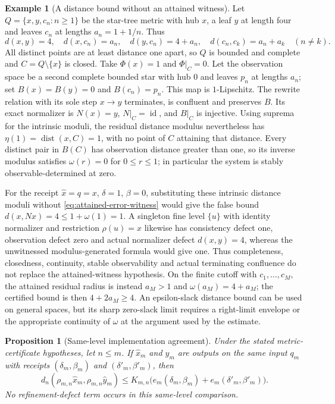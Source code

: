 \documentclass[11pt]{article}
\newtheorem{proposition}[theorem]{Proposition}
\theoremstyle{definition}
\newtheorem{example}[theorem]{Example}
\theoremstyle{remark}
\numberwithin{equation}{section}
\newcommand{\dist}{\operatorname{dist}}
\newcommand{\id}{\operatorname{id}}
\begin{document}
\begin{example}[A distance bound without an attained witness]
\label{ex:unattained-receipt}
Let $Q=\{x,y,c_n:n\ge1\}$ be the star-tree metric with hub $x$, a leaf
$y$ at length four and leaves $c_n$ at lengths $a_n=1+1/n$. Thus
\[
 d(x,y)=4,\quad d(x,c_n)=a_n,\quad d(y,c_n)=4+a_n,\quad
 d(c_n,c_k)=a_n+a_k\quad(n\ne k).
\]
All distinct points are at least distance one apart, so $Q$ is bounded and
complete and $C=Q\setminus\{x\}$ is closed. Take $\Phi(x)=1$ and
$\Phi|_C=0$. Let the observation space be a second complete bounded star
with hub $0$ and leaves $p_n$ at lengths $a_n$; set
$B(x)=B(y)=0$ and $B(c_n)=p_n$. This map is $1$-Lipschitz.
The rewrite relation with its sole step $x\to y$ terminates, is confluent
and preserves $B$. Its exact normalizer is $N(x)=y$, $N|_C=\id$, and
$B|_C$ is injective. Using suprema for the intrinsic moduli, the residual
distance modulus nevertheless has
$\eta(1)=\dist(x,C)=1$, with no point of $C$ attaining that distance.
Every distinct pair in $B(C)$ has observation distance greater than one,
so its inverse modulus satisfies $\omega(r)=0$ for $0\le r\le1$; in
particular the system is stably observable-determined at zero.

For the receipt $\widehat x=q=x$, $\delta=1$, $\beta=0$, substituting
these intrinsic distance moduli without
\eqref{eq:attained-error-witness} would give the false bound
$d(x,Nx)=4\le1+\omega(1)=1$. A singleton fine level $\{u\}$ with identity
normalizer and restriction $\rho(u)=x$ likewise has consistency defect one,
observation defect zero and actual normalizer defect $d(x,y)=4$, whereas
the unwitnessed modulus-generated formula would give one.
Thus completeness, closedness, continuity,
stable observability and actual terminating confluence do not replace the
attained-witness hypothesis. On the finite cutoff with $c_1,\ldots,c_M$,
the attained residual radius is instead $a_M>1$ and
$\omega(a_M)=4+a_M$; the certified bound is then $4+2a_M\ge4$.
An epsilon-slack distance bound can be used on general spaces, but its sharp
zero-slack limit requires a right-limit envelope or the appropriate
continuity of $\omega$ at the argument used by the estimate.
\end{example}

\begin{proposition}[Same-level implementation agreement]
\label{prop:same-level-implementations}
Under the stated metric-certificate hypotheses, let $n\le m$. If
$\widehat x_m$ and $\widehat y_m$ are outputs on the same
input $q_m$ with receipts $(\delta_m,\beta_m)$ and
$(\delta'_m,\beta'_m)$, then
\[
 d_n(\rho_{m,n}\widehat x_m,\rho_{m,n}\widehat y_m)
 \le
 K_{m,n}\bigl(
 e_m(\delta_m,\beta_m)+e_m(\delta'_m,\beta'_m)
 \bigr).
\]
No refinement-defect term occurs in this same-level comparison.
\end{proposition}
\end{document}
